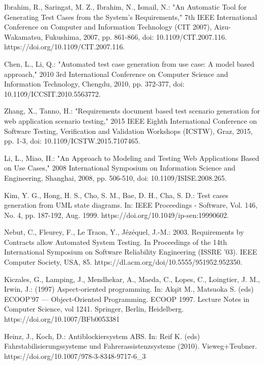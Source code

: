 \documentclass[a4paper,10pt, bibliography=totocnumbered]{scrreprt}
\begin{document}
\begin{thebibliography}{9}
 Ibrahim, R., Saringat, M. Z., Ibrahim, N., Ismail, N.: "An Automatic Tool for Generating Test Cases from the System's Requirements," 7th IEEE International Conference on Computer and Information Technology (CIT 2007), Aizu-Wakamatsu, Fukushima, 2007, pp. 861-866, doi: 10.1109/CIT.2007.116.
https://doi.org/10.1109/CIT.2007.116.

 Chen, L., Li, Q.: "Automated test case generation from use case: A model based approach," 2010 3rd International Conference on Computer Science and Information Technology, Chengdu, 2010, pp. 372-377, doi: 10.1109/ICCSIT.2010.5563772.

 Zhang, X., Tanno, H.: "Requirements document based test scenario generation for web application scenario testing," 2015 IEEE Eighth International Conference on Software Testing, Verification and Validation Workshops (ICSTW), Graz, 2015, pp. 1-3, doi: 10.1109/ICSTW.2015.7107465.

 Li, L., Miao, H.: "An Approach to Modeling and Testing Web Applications Based on Use Cases," 2008 International Symposium on Information Science and Engineering, Shanghai, 2008, pp. 506-510, doi: 10.1109/ISISE.2008.265.

 Kim, Y. G., Hong, H. S., Cho, S. M., Bae, D. H., Cha, S. D.: Test cases generation from UML state diagrams.
In: IEEE Proceedings - Software, Vol. 146, No. 4, pp. 187-192, Aug. 1999.
https://doi.org/10.1049/ip-sen:19990602.

 Nebut, C., Fleurey, F., Le Traon, Y., Jézéquel, J.-M.: 2003. Requirements by Contracts allow Automated System Testing. In Proceedings of the 14th International Symposium on Software Reliability Engineering (ISSRE '03). IEEE Computer Society, USA, 85.
https://dl.acm.org/doi/10.5555/951952.952350.


 Kiczales, G., Lamping, J., Mendhekar, A., Maeda, C., Lopes, C., Loingtier, J. M., Irwin, J.: (1997) Aspect-oriented programming. In: Akşit M., Matsuoka S. (eds) ECOOP'97 — Object-Oriented Programming. ECOOP 1997. Lecture Notes in Computer Science, vol 1241. Springer, Berlin, Heidelberg.
https://doi.org/10.1007/BFb0053381

 Heinz, J., Koch, D.: Antiblockiersystem ABS.
In: Reif K. (eds) Fahrstabilisierungssysteme und Fahrerassistenzsysteme (2010). Vieweg+Teubner. 
https://doi.org/10.1007/978-3-8348-9717-6\_3


\end{thebibliography}
\end{document}
